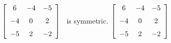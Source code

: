 {$\left[ \begin {array}{ccc} 6&-4&-5\\\noalign{\medskip}-4&0&2
\\\noalign{\medskip}-5&2&-2\end {array} \right]
$} 
{\tta\ is symmetric. $\left[ \begin {array}{ccc} 6&-4&-5\\\noalign{\medskip}-4&0&2
\\\noalign{\medskip}-5&2&-2\end {array} \right]
$}


  

